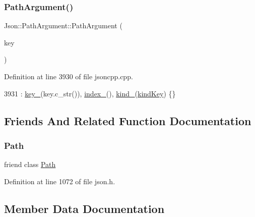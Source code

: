 \subsubsection{\texorpdfstring{Path\+Argument()}{PathArgument()}\hspace{0.1cm}{\footnotesize\ttfamily [4/4]}}
{\footnotesize\ttfamily Json\+::\+Path\+Argument\+::\+Path\+Argument (\begin{DoxyParamCaption}\item[{const \hyperlink{json_8h_a1e723f95759de062585bc4a8fd3fa4be}{J\+S\+O\+N\+C\+P\+P\+\_\+\+S\+T\+R\+I\+NG} \&}]{key }\end{DoxyParamCaption})}



Definition at line 3930 of file jsoncpp.\+cpp.


\begin{DoxyCode}
3931     : \hyperlink{class_json_1_1_path_argument_af4024368548ff730ef2bed97d6f1ca43}{key\_}(key.c\_str()), \hyperlink{class_json_1_1_path_argument_afd5857d1b6bfaae6961333bdae7bd5ec}{index\_}(), \hyperlink{class_json_1_1_path_argument_ad4bc4b544b155a3d9c7788572ecf991b}{kind\_}(\hyperlink{class_json_1_1_path_argument_a2420bbad778573c147e578701b84d9b9a74f5968d06c01701b7a46092c33ba7d1}{kindKey}) \{\}
\end{DoxyCode}


\subsection{Friends And Related Function Documentation}
\mbox{\label{class_json_1_1_path_argument_a4877239a6b7f09fbf5a61ca68a49d74c}} 
\subsubsection{\texorpdfstring{Path}{Path}}
{\footnotesize\ttfamily friend class \hyperlink{class_json_1_1_path}{Path}\hspace{0.3cm}{\ttfamily [friend]}}



Definition at line 1072 of file json.\+h.



\subsection{Member Data Documentation}
\mbox{\label{class_json_1_1_path_argument_afd5857d1b6bfaae6961333bdae7bd5ec}} 
